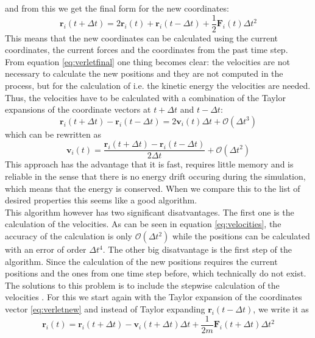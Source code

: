\documentclass[12pt]{article}
\begin{document}
and from this we get the final form for the new coordinates:
\begin{equation}
    \label{eq:verletfinal}
    \mathbf{r}_i(t+\Delta t) = 2\mathbf{r}_i(t)+ \mathbf{r}_i(t-\Delta t)+ \frac1{2} {\mathbf{F}}_i(t) \Delta t^2
\end{equation}
This means that the new coordinates can be calculated using the current coordinates, the current forces and the coordinates from the past time step.\\
From equation \eqref{eq:verletfinal} one thing becomes clear: the velocities are not necessary to calculate the new positions and they are not
computed in the process, but for the calculation of i.e. the kinetic energy the velocities are needed. Thus, the velocities have to be calculated with
a combination of the Taylor expansions of the coordinate vectors at $t+\Delta t$ and $t-\Delta t$:
\begin{equation}
    \mathbf{r}_i(t+\Delta t) - \mathbf{r}_i(t-\Delta t) = 2\mathbf{v}_i(t)\Delta t + \mathcal{O}(\Delta t^3)
\end{equation}
which can be rewritten as
\begin{equation}
    \label{eq:velocities}
    \mathbf{v}_i(t) = \frac{\mathbf{r}_i(t+\Delta t) - \mathbf{r}_i(t-\Delta t)}{2\Delta t} + \mathcal{O}(\Delta t^2)
\end{equation}
This approach has the advantage that it is fast, requires little memory and is reliable in the sense that there is no energy drift occuring during the
simulation, which means that the energy is conserved. When we compare this to the list of desired properties this seems like a good algorithm.\\
This algorithm however has two significant disatvantages. The first one is the calculation of the velocities. As can be seen in equation
\eqref{eq:velocities}, the accuracy of the calculation is only $\mathcal{O}(\Delta t^2)$ while the positions can be calculated with an error of order
$\Delta t^4$. The other big disatvantage is the first step of the algorithm. Since the calculation of the new positions requires the current positions
and the ones from one time step before, which technically do not exist.\\
The solutions to this problem is to include the stepwise calculation of the velocities \cite{swope1982}. For this we start again with the Taylor
expansion of the coordinates vector \eqref{eq:verletnew} and instead of Taylor expanding $\mathbf{r}_i(t-\Delta t)$, we write it as 
\begin{equation}
    \mathbf{r}_i(t) = \mathbf{r}_i(t+\Delta t) - \mathbf{v}_i(t+\Delta t) \Delta t + \frac1{2m} \mathbf{F}_i(t+\Delta t) \Delta t^2
\end{equation}
\end{document}
